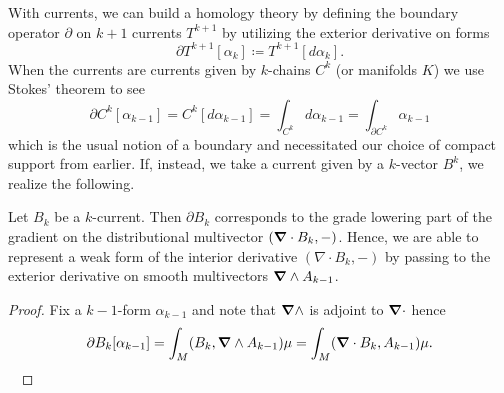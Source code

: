 \documentclass[conf]{new-aiaa}
\begin{document}
With currents, we can build a homology theory \cite{iversen_cauchy_1989} by defining the boundary operator $\partial$ on $k+1$ currents $T^{k+1}$ by utilizing the exterior derivative on forms 
\begin{equation}
\partial T^{k+1}[\alpha_k] \coloneqq T^{k+1}[d\alpha_k].
\end{equation}
When the currents are currents given by $k$-chains $C^k$ (or manifolds $K$) we use Stokes' theorem to see
\begin{equation}
\label{eq:stokes}
\partial C^k[\alpha_{k-1}] = C^k[d\alpha_{k-1}] = \int_{C^k} d\alpha_{k-1} = \int_{\partial C^k} \alpha_{k-1}
\end{equation}
which is the usual notion of a boundary and necessitated our choice of compact support from earlier. If, instead, we take a current given by a $k$-vector $B^k$, we realize the following.
\begin{proposition}
\label{prop:grad_dot}
    Let $B_k$ be a $k$-current. Then $\partial B_k$ corresponds to the grade lowering part of the gradient on the distributional multivector $(\boldsymbol{\nabla} \cdot B_k,-)$. Hence, we are able to represent a weak form of the interior derivative $(\nabla \cdot B_k,-)$ by passing to the exterior derivative on smooth multivectors $\boldsymbol{\nabla} \wedge A_{k-1}$.
\end{proposition}
\begin{proof}
Fix a $k-1$-form $\alpha_{k-1}$ and note that $\boldsymbol{\nabla} \wedge$ is adjoint to $\boldsymbol{\nabla} \cdot$ hence
\begin{align}
    \partial B_k[\alpha_{k-1}]=  \int_M(B_k,\boldsymbol{\nabla} \wedge A_{k-1})\mu = \int_M(\boldsymbol{\nabla} \cdot B_k, A_{k-1}) \mu.
\end{align}\
\end{proof}
\end{document}
